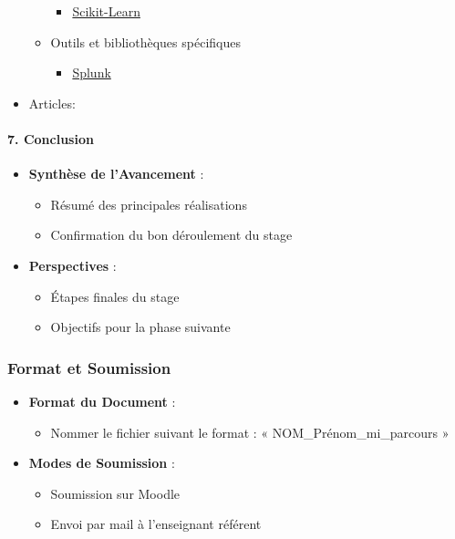 \documentclass[
  letterpaper,
  DIV=11,
  numbers=noendperiod]{scrartcl}
\let\oldparagraph\paragraph
\renewcommand{\paragraph}[1]{\oldparagraph{#1}\mbox{}}
\providecommand{\tightlist}{%
  \setlength{\itemsep}{0pt}\setlength{\parskip}{0pt}}\usepackage{longtable,booktabs,array}
\begin{document}
\begin{itemize}
\begin{itemize}
    \begin{itemize}
    \tightlist
    \item
      \href{https://scikit-learn.org/stable/user_guide.html\#user-guide}{Scikit-Learn}
    \end{itemize}
  \item
    Outils et bibliothèques spécifiques

    \begin{itemize}
    \tightlist
    \item
      \href{https://www.splunk.com/fr_fr}{Splunk}
    \end{itemize}
  \end{itemize}
\item
  Articles:
\end{itemize}

\paragraph{7. Conclusion}\label{conclusion}

\begin{itemize}
\tightlist
\item
  \textbf{Synthèse de l'Avancement} :

  \begin{itemize}
  \tightlist
  \item
    Résumé des principales réalisations
  \item
    Confirmation du bon déroulement du stage
  \end{itemize}
\item
  \textbf{Perspectives} :

  \begin{itemize}
  \tightlist
  \item
    Étapes finales du stage
  \item
    Objectifs pour la phase suivante
  \end{itemize}
\end{itemize}

\subsubsection{Format et Soumission}\label{format-et-soumission}

\begin{itemize}
\tightlist
\item
  \textbf{Format du Document} :

  \begin{itemize}
  \tightlist
  \item
    Nommer le fichier suivant le format : « NOM\_Prénom\_mi\_parcours »
  \end{itemize}
\item
  \textbf{Modes de Soumission} :

  \begin{itemize}
  \tightlist
  \item
    Soumission sur Moodle
  \item
    Envoi par mail à l'enseignant référent
  \end{itemize}
\end{itemize}
\end{document}
